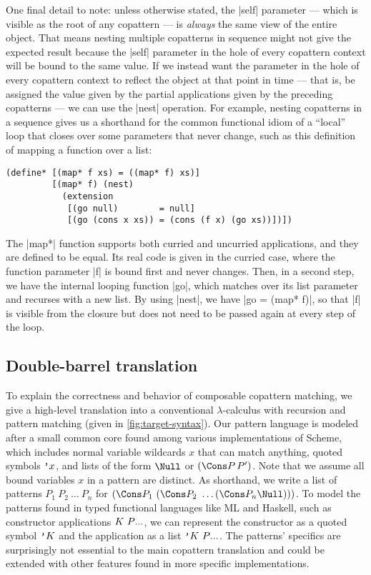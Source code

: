 One final detail to note: unless otherwise stated, the \scm|self| parameter --- which is visible as the root of any copattern --- is \emph{always} the same view of the entire object.
That means nesting multiple copatterns in sequence might not give the expected result because the \scm|self| parameter in the hole of every copattern context will be bound to the same value.
If we instead want the parameter in the hole of every copattern context to reflect the object at that point in time --- that is, be assigned the value given by the partial applications given by the preceding copatterns --- we can use the \scm|nest| operation.
For example, nesting copatterns in a sequence gives us a shorthand for the common functional idiom of a ``local'' loop that closes over some parameters that never change, such as this definition of mapping a function over a list:
\begin{verbatim}
(define* [(map* f xs) = ((map* f) xs)]
         [(map* f) (nest)
           (extension
            [(go null)        = null]
            [(go (cons x xs)) = (cons (f x) (go xs))])])
\end{verbatim}
The \scm|map*| function supports both curried and uncurried applications, and they are defined to be equal.
Its real code is given in the curried case, where the function parameter \scm|f| is bound first and never changes.
Then, in a second step, we have the internal looping function \scm|go|, which matches over its list parameter and recurses with a new list.
By using \scm|nest|, we have \scm|go = (map* f)|, so that \scm|f| is visible from the closure but does not need to be passed again at every step of the loop.

\subsection{Double-barrel translation}

To explain the correctness and behavior of composable copattern matching, we give a high-level translation into a conventional $\lambda$-calculus with recursion and pattern matching (given in \cref{fig:target-syntax}).
Our pattern language is modeled after a small common core found among various implementations of Scheme, which includes normal variable wildcards $x$ that can match anything, quoted symbols $\text{\tt'}{x}$, and lists of the form $\Null$ or $(\Cons P \, P')$.
Note that we assume all bound variables $x$ in a pattern are distinct.
As shorthand, we write a list of patterns $P_1 ~ P_2 ~ \dots ~ P_n$ for $(\Cons P_1 ~ (\Cons P_2 ~ \dots (\Cons P_n \Null)))$.
To model the patterns found in typed functional languages like ML and Haskell, such as constructor applications $K ~ P\overset{{}_{}}{...}$, we can represent the constructor  as a quoted symbol $\text{\tt'}{K}$ and the application as a list $\text{\tt'}{K} ~ P\overset{{}_{}}{...}$.
The patterns' specifics are surprisingly not essential to the main copattern translation and could be extended with other features found in more specific implementations.  


